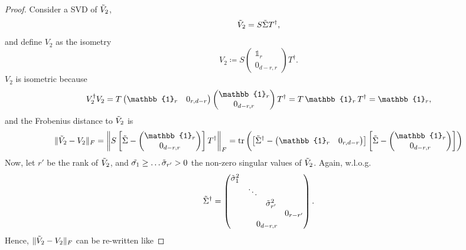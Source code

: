 \begin{proof}
Consider a SVD of $\Tilde{V}_2$,
\begin{equation*}
\Tilde{V}_2 = S\Tilde{\Sigma}T^{\dag},
\end{equation*} and define $V_2$ as the isometry
\begin{equation*}
V_2\coloneqq S \begin{pmatrix} \mathbb{1}_r \\ 0_{d-r,r} \end{pmatrix} T^{\dag}.
\end{equation*} $V_2$ is isometric because
\begin{equation*}
V_2^{\dag}V_2=T\begin{pmatrix} \mathbb{1}_r & 0_{r,d-r} \end{pmatrix} \begin{pmatrix} \mathbb{1}_r \\ 0_{d-r,r} \end{pmatrix} T^{\dag}=T\thinspace \mathbb{1}_r \thinspace T^{\dag} = \mathbb{1}_r,
\end{equation*}
and the Frobenius distance to $\Tilde{V}_2$ is
\begin{equation*}
\|\Tilde{V}_2-V_2\|_F = \left\|S\left[\Tilde{\Sigma}-\begin{pmatrix}
\mathbb{1}_r \\ 0_{d-r,r}\end{pmatrix}\right]T^{\dag}\right\|_F=\operatorname{tr}\left(\left[\Tilde{\Sigma}^{\dag}-\begin{pmatrix} \mathbb{1}_r & 0_{r,d-r}\end{pmatrix}\right]\left[\Tilde{\Sigma}-\begin{pmatrix} \mathbb{1}_r \\ 0_{d-r,r}\end{pmatrix}\right]\right)
\end{equation*}
Now, let $r'$ be the rank of $\Tilde{V}_2$, and $\Tilde{\sigma_1}\geq\dots\Tilde{\sigma}_{r'}>0$ the non-zero singular values of $\Tilde{V}_2$. Again, w.l.o.g.\
\begin{equation*}
\Tilde{\Sigma}^{\dag}=
\begin{pmatrix}
\Tilde{\sigma}^2_1 &&& \\
&\ddots&& \\
&&\Tilde{\sigma}^2_{r'}& \\
&&&0_{r-r'}\\[0.1em]
\multicolumn{4}{c}{0_{d-r,r}}
\end{pmatrix}.
\end{equation*}
Hence, $\|\Tilde{V}_2-V_2\|_F$ can be re-written like

\end{proof}
